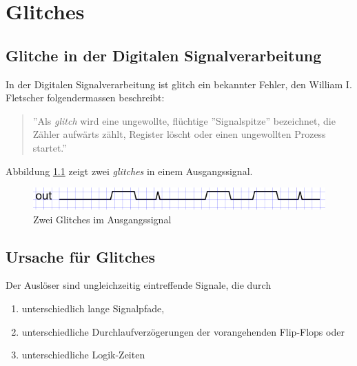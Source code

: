 
\chapter{Glitches}\label{chap.glitch}

\section{Glitche in der Digitalen Signalverarbeitung}\label{sect.glitch_def}
In der Digitalen Signalverarbeitung ist glitch ein bekannter Fehler, den William I. Fletscher folgendermassen beschreibt:

\begin{quote}
''Als \textit{glitch}  wird eine ungewollte, flüchtige ''Signalspitze'' bezeichnet, die Zähler aufwärts zählt, Register löscht oder einen ungewollten Prozess startet.'' \cite{F_glitches}
\end{quote}


Abbildung \ref{fig.glitch.def} zeigt zwei \textit{glitches} in einem Ausgangssignal.\\

\begin{figure}[H]
	\includegraphics[width=\textwidth]{images/glitch/def_glitch_1.png}
	\caption{Zwei Glitches im Ausgangssignal}
	\label{fig.glitch.def}
\end{figure}


\section{Ursache für Glitches}\label{sect.glitch_ursache}

Der Auslöser sind ungleichzeitig eintreffende Signale, die durch

\begin{enumerate}
\item unterschiedlich lange Signalpfade,
\item unterschiedliche Durchlaufverzögerungen der vorangehenden Flip-Flops oder
\item unterschiedliche Logik-Zeiten
\end{enumerate}

